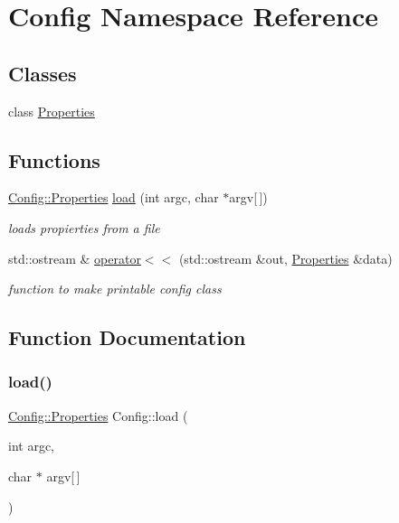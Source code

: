 \hypertarget{namespace_config}{}\section{Config Namespace Reference}
\label{namespace_config}
\subsection*{Classes}
\begin{DoxyCompactItemize}
\item 
class \hyperlink{class_config_1_1_properties}{Properties}
\end{DoxyCompactItemize}
\subsection*{Functions}
\begin{DoxyCompactItemize}
\item 
\hyperlink{class_config_1_1_properties}{Config\+::\+Properties} \hyperlink{namespace_config_a845ed902425e4e06b984e0ecd861fa18}{load} (int argc, char $\ast$argv\mbox{[}$\,$\mbox{]})
\begin{DoxyCompactList}\small\item\em loads propierties from a file \end{DoxyCompactList}\item 
std\+::ostream \& \hyperlink{namespace_config_af48e0d12acc53c2d353939b563e472e2}{operator$<$$<$} (std\+::ostream \&out, \hyperlink{class_config_1_1_properties}{Properties} \&data)
\begin{DoxyCompactList}\small\item\em function to make printable config class \end{DoxyCompactList}\end{DoxyCompactItemize}


\subsection{Function Documentation}
\mbox{\label{namespace_config_a845ed902425e4e06b984e0ecd861fa18}} 
\subsubsection{\texorpdfstring{load()}{load()}}
{\footnotesize\ttfamily \hyperlink{class_config_1_1_properties}{Config\+::\+Properties} Config\+::load (\begin{DoxyParamCaption}\item[{int}]{argc,  }\item[{char $\ast$}]{argv\mbox{[}$\,$\mbox{]} }\end{DoxyParamCaption})\hspace{0.3cm}{\ttfamily [inline]}}



